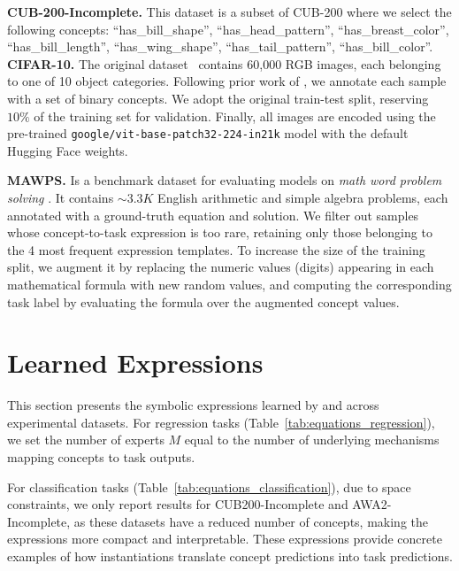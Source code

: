 \documentclass{article}
\theoremstyle{plain}
\theoremstyle{definition}
\theoremstyle{remark}
\newcommand{\mypar}[1]{\noindent\textbf{#1}}
\begin{document}
\mypar{CUB-200-Incomplete. } This dataset is a subset of CUB-200 where we select the following concepts: ``has\_bill\_shape'', ``has\_head\_pattern'', ``has\_breast\_color'', ``has\_bill\_length'', ``has\_wing\_shape'', ``has\_tail\_pattern'', ``has\_bill\_color''.
\mypar{CIFAR-10. } The original dataset~\citep{krizhevsky2009} contains 60,000 RGB images, each belonging to one of 10 object categories. Following prior work of \citet{oikarinen2023label}, we annotate each sample with a set of binary concepts. We adopt the original train-test split, reserving $10\%$ of the training set for validation. Finally, all images are encoded using the pre-trained \texttt{google/vit-base-patch32-224-in21k} model with the default Hugging Face weights.

\mypar{MAWPS.} 
Is a benchmark dataset for evaluating models on \textit{math word problem solving} \citep{koncel2016mawps}. It contains $\sim3.3K$ English arithmetic and simple algebra problems, each annotated with a ground-truth equation and solution. We filter out samples whose concept-to-task expression is too rare, retaining only those belonging to the 4 most frequent expression templates. To increase the size of the training split, we augment it by replacing the numeric values (digits) appearing in each mathematical formula with new random values, and computing the corresponding task label by evaluating the formula over the augmented concept values.


\section{Learned Expressions}
\label{app:explanations}

This section presents the symbolic expressions learned by \linearacro{} and \symbolicacro{} across experimental datasets. For regression tasks (Table~\ref{tab:equations_regression}), we set the number of experts $M$ equal to the number of underlying mechanisms mapping concepts to task outputs.

For classification tasks (Table~\ref{tab:equations_classification}), due to space constraints, we only report results for CUB200-Incomplete and AWA2-Incomplete, as these datasets have a reduced number of concepts, making the expressions more compact and interpretable. These expressions provide concrete examples of how \classacro{} instantiations translate concept predictions into task predictions.


\end{document}
